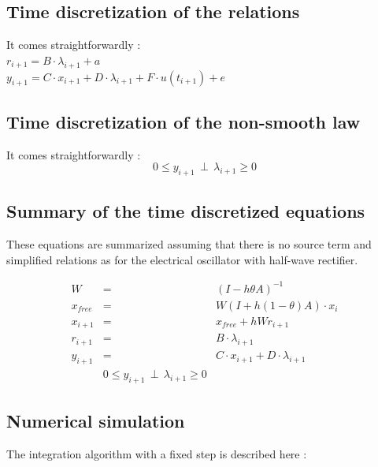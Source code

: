 \documentclass[10pt]{article}
\begin{document}
\subsection{Time discretization of the relations}
It comes straightforwardly :\\

$r_{i+1} = B \cdot \lambda_{i+1} + a$\\

$y_{i+1} = C \cdot x_{i+1} + D \cdot \lambda_{i+1} + F \cdot u(t_{i+1}) + e$\\


\subsection{Time discretization of the non-smooth law}
It comes straightforwardly :
\[
0 \leq y_{i+1} \, \perp \, \lambda_{i+1} \geq 0
\]

\subsection{Summary of the time discretized equations}
These equations are summarized assuming that there is no source term and simplified relations as for the
electrical oscillator with half-wave rectifier.

\begin{eqnarray*}
W & = & (I - h \theta A)^{-1} \\
x_{free} & = & W(I + h (1-\theta) A) \cdot x_{i} \\
x_{i+1} & = & x_{free} + h W r_{i+1} \\
r_{i+1} & = & B \cdot \lambda_{i+1}  \\
y_{i+1} & = & C \cdot x_{i+1} + D \cdot \lambda_{i+1}  \\
 & 0 \leq y_{i+1} \, \perp \, \lambda_{i+1} \geq 0 &
\end{eqnarray*}

\subsection{Numerical simulation}
The integration algorithm with a fixed step is described here :
\end{document}
